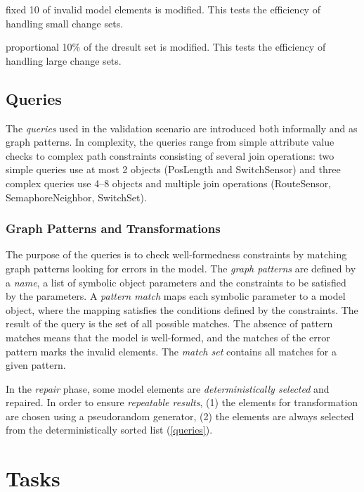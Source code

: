 \documentclass[submission,copyright,creativecommons]{eptcs}
\begin{document}
\begin{compactdesc}
\item[fixed] 10 of invalid model elements is modified. This tests the efficiency of handling small change sets.
\item[proportional] 10\% of the dresult set is modified. This tests the efficiency of handling large change sets.
\end{compactdesc}

\subsection{Queries}
\label{queries}

The \emph{queries} used in the validation scenario are introduced both informally and as graph patterns. In complexity, the queries range from simple attribute value checks to complex path constraints consisting of several join operations: two simple queries use at most 2 objects (\textsf{PosLength} and \textsf{SwitchSensor}) and three complex queries use 4--8 objects and multiple join operations (\textsf{RouteSensor}, \textsf{SemaphoreNeighbor}, \textsf{SwitchSet}). 

\subsubsection{Graph Patterns and Transformations}

The purpose of the queries is to check well-formedness constraints by matching graph patterns looking for errors in the model. The \emph{graph patterns} are defined by a \emph{name}, a list of symbolic object parameters and the constraints to be satisfied by the parameters. A \emph{pattern match} maps each symbolic parameter to a model object, where the mapping satisfies the conditions defined by the constraints. The result of the query is the set of all possible matches. The absence of pattern matches means that the model is well-formed, and the matches of the error pattern marks the invalid elements. The \emph{match set} contains all matches for a given pattern.

In the \emph{repair} phase, some model elements are \emph{deterministically selected} and repaired. In order to ensure \emph{repeatable results}, (1) the elements for transformation are chosen using a pseudorandom generator, (2) the elements are always selected from the deterministically sorted list (\autoref{queries}).

\section{Tasks}
\label{tasks}
\end{document}
